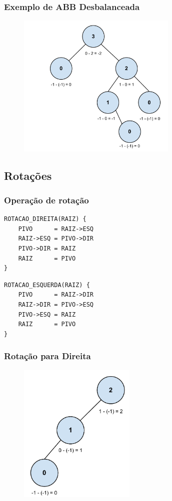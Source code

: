 \begin{frame}
    \frametitle{Exemplo de ABB Desbalanceada}
    
    \begin{figure}[tbp]
    \includegraphics[keepaspectratio=true,width=3in]{figs/fig_arvores/Arvore_Desbalanceada}
    \centering
    \end{figure}
\end{frame}

\subsection{Rotações}

\begin{frame}[fragile]
\frametitle{Operação de rotação}

\begin{verbatim}
ROTACAO_DIREITA(RAIZ) {
    PIVO      = RAIZ->ESQ
    RAIZ->ESQ = PIVO->DIR
    PIVO->DIR = RAIZ
    RAIZ      = PIVO
}
\end{verbatim}

\begin{verbatim}
ROTACAO_ESQUERDA(RAIZ) {
    PIVO      = RAIZ->DIR
    RAIZ->DIR = PIVO->ESQ
    PIVO->ESQ = RAIZ
    RAIZ      = PIVO
}
\end{verbatim}
\end{frame}

\begin{frame}
    \frametitle{Rotação para Direita}
    
    \begin{figure}[tbp]
    \includegraphics[keepaspectratio=true,width=2.2in]{figs/fig_arvores/Balanceamento_Arvore2}
    \centering
    \end{figure}
\end{frame}

